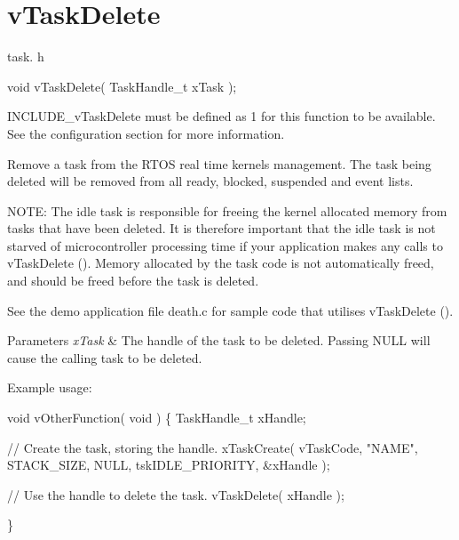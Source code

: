 \hypertarget{group__v_task_delete}{}\section{v\+Task\+Delete}
\label{group__v_task_delete}
task. h 
\begin{DoxyPre}void vTaskDelete( TaskHandle\_t xTask );\end{DoxyPre}


I\+N\+C\+L\+U\+D\+E\+\_\+v\+Task\+Delete must be defined as 1 for this function to be available. See the configuration section for more information.

Remove a task from the R\+T\+O\+S real time kernel\textquotesingle{}s management. The task being deleted will be removed from all ready, blocked, suspended and event lists.

N\+O\+T\+E\+: The idle task is responsible for freeing the kernel allocated memory from tasks that have been deleted. It is therefore important that the idle task is not starved of microcontroller processing time if your application makes any calls to v\+Task\+Delete (). Memory allocated by the task code is not automatically freed, and should be freed before the task is deleted.

See the demo application file death.\+c for sample code that utilises v\+Task\+Delete ().


\begin{DoxyParams}{Parameters}
{\em x\+Task} & The handle of the task to be deleted. Passing N\+U\+L\+L will cause the calling task to be deleted.\\
\hline
\end{DoxyParams}
Example usage\+: 
\begin{DoxyPre}
void vOtherFunction( void )
\{
TaskHandle\_t xHandle;
\begin{DoxyVerb}// Create the task, storing the handle.
xTaskCreate( vTaskCode, "NAME", STACK_SIZE, NULL, tskIDLE_PRIORITY, &xHandle );

// Use the handle to delete the task.
vTaskDelete( xHandle );
\end{DoxyVerb}

\}
  \end{DoxyPre}
 